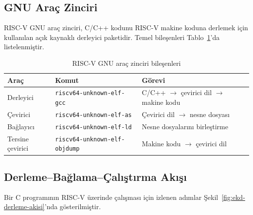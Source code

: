 \subsection{GNU Araç Zinciri}
\label{sec:ekd-gnu-arac}

RISC-V GNU araç zinciri, C/C++ kodunu RISC-V makine koduna derlemek için kullanılan açık kaynaklı derleyici paketidir. Temel bileşenleri Tablo~\ref{tab:ekd-gnu-araclar}'da listelenmiştir.

\begin{table}[H]
\centering
\caption[RISC-V GNU araç zinciri bileşenleri]{RISC-V GNU araç zinciri bileşenleri}
\label{tab:ekd-gnu-araclar}
\begin{tabular}{@{}lll@{}}
\toprule
\textbf{Araç} & \textbf{Komut} & \textbf{Görevi} \\
\midrule
Derleyici       & \texttt{riscv64-unknown-elf-gcc}     & C/C++ $\to$ çevirici dil $\to$ makine kodu \\
Çevirici        & \texttt{riscv64-unknown-elf-as}       & Çevirici dil $\to$ nesne dosyası \\
Bağlayıcı       & \texttt{riscv64-unknown-elf-ld}       & Nesne dosyalarını birleştirme \\
Tersine çevirici & \texttt{riscv64-unknown-elf-objdump} & Makine kodu $\to$ çevirici dil \\
\bottomrule
\end{tabular}
\end{table}

\subsection{Derleme--Bağlama--Çalıştırma Akışı}
\label{sec:ekd-derleme-akisi}

Bir C programının RISC-V üzerinde çalışması için izlenen adımlar Şekil~\ref{fig:ekd-derleme-akisi}'nda gösterilmiştir.

